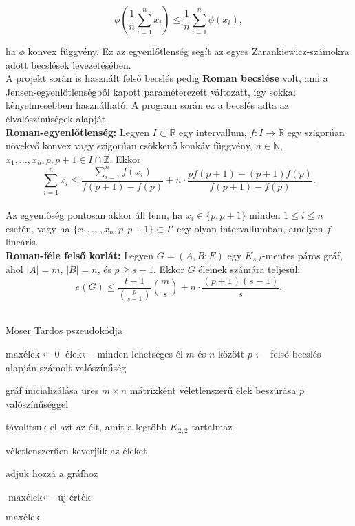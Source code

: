 \documentclass[12pt,a4paper]{article}
\begin{document}
\[
\phi\left( \frac{1}{n} \sum_{i=1}^{n} x_i \right) \leq \frac{1}{n} \sum_{i=1}^{n} \phi(x_i),
\]

ha $\phi$ konvex függvény. Ez az egyenlőtlenség segít az egyes Zarankiewicz-számokra adott becslések levezetésében.
\\[2mm]
A projekt során is használt felső becslés pedig \textbf{Roman becslése} volt, ami a Jensen-egyenlőtlenségből kapott paraméterezett változatt, így sokkal kényelmesebben használható. A program során ez a becslés adta az élvalószínűségek alapját.
\\[2mm]
\textbf{Roman-egyenlőtlenség:} Legyen $I \subset \mathbb{R}$ egy intervallum, $f : I \to \mathbb{R}$ egy szigorúan növekvő konvex vagy szigorúan csökkenő konkáv függvény, $n \in \mathbb{N}$, $x_1, \dots, x_n, p, p+1 \in I \cap \mathbb{Z}$. Ekkor
\[
\sum_{i=1}^{n} x_i \leq \frac{\sum_{i=1}^{n} f(x_i)}{f(p+1) - f(p)} + n \cdot \frac{p f(p+1) - (p+1) f(p)}{f(p+1) - f(p)}.
\]
\\[2mm]
Az egyenlőség pontosan akkor áll fenn, ha $x_i \in \{p, p+1\}$ minden $1 \leq i \leq n$ esetén, vagy ha $\{x_1, \dots, x_n, p, p+1\} \subset I'$ egy olyan intervallumban, amelyen $f$ lineáris.
\\[2mm]
\textbf{Roman-féle felső korlát:} Legyen $G = (A, B; E)$ egy $K_{s,t}$-mentes páros gráf, ahol $|A| = m$, $|B| = n$, és $p \geq s - 1$. Ekkor $G$ éleinek számára teljesül:
\[
e(G) \leq \frac{t - 1}{\binom{p}{s - 1}} \binom{m}{s} + n \cdot \frac{(p + 1)(s - 1)}{s}.
\]
\\[2mm]

\begin{algorithm}
\caption{Moser Tardos pszeudokódja}
\begin{algorithmic}[1]

    \State $\text{maxélek} \gets 0$
    \State $\text{élek} \gets$ minden lehetséges él $m$ és $n$ között
    \State $p \gets$ felső becslés alapján számolt valószínűség

        \State gráf inicializálása üres $m \times n$ mátrixként
        \State véletlenszerű élek beszúrása $p$ valószínűséggel

            \State távolítsuk el azt az $\text{élt}$, amit a legtöbb $K_{2,2}$ tartalmaz
        \EndWhile

        \State véletlenszerűen keverjük az éleket

                \State adjuk hozzá a gráfhoz
            \EndIf
        \EndFor

            \State $\text{maxélek} \gets$ új érték
        \EndIf
    \EndFor

    \State \Return $\text{maxélek}$
\EndFunction

\end{algorithmic}
\end{algorithm}
\end{document}
